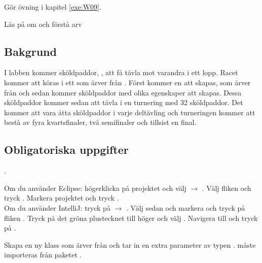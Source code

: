 

\Teamlab{\LabWeekNINE}

\begin{Goals}

\end{Goals}

\begin{Preparations}
\item Gör övning {\tt \ExeWeekNINE} i kapitel \ref{exe:W09}.
\item Läs på om och förstå arv

\end{Preparations}

\subsection{Bakgrund}
I labben kommer sköldpaddor, , att få tävla mot varandra i ett lopp. Racet kommer att köras i ett  som ärver från . Först kommer en  att skapas, som ärver från  och sedan kommer sköldpaddor med olika egenskaper att skapas. Dessa sköldpaddor kommer sedan att tävla i en turnering med 32 sköldpaddor. Det kommer att vara åtta sköldpaddor i varje deltävling och turneringen kommer att bestå av fyra kvartsfinaler, två semifinaler och tillsist en final.

\subsection{Obligatoriska uppgifter}

\Task {}.

\Subtask Om du använder Eclipse: högerklicka på projektet  och välj  $\rightarrow$ . Välj fliken  och tryck . Markera projektet  och tryck . \\
Om du använder IntelliJ: tryck på  $\rightarrow$ . Välj sedan  och markera  och tryck på fliken . Tryck på det gröna plustecknet till höger och välj . Navigera till  och tryck på .

\Subtask Skapa en ny klass  som ärver från  och tar in en extra parameter  av typen .  måste importeras från paketet .

